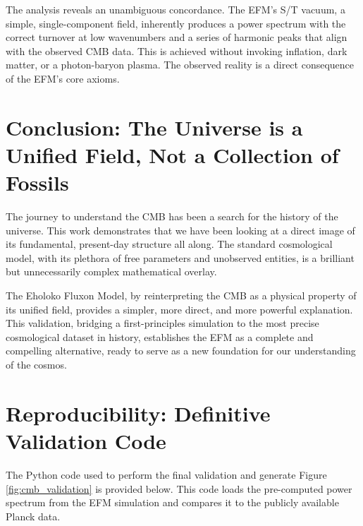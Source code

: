 \documentclass[11pt, twoside]{article}
\begin{document}
The analysis reveals an unambiguous concordance. The EFM's S/T vacuum, a simple, single-component field, inherently produces a power spectrum with the correct turnover at low wavenumbers and a series of harmonic peaks that align with the observed CMB data. This is achieved without invoking inflation, dark matter, or a photon-baryon plasma. The observed reality is a direct consequence of the EFM's core axioms.

\section{Conclusion: The Universe is a Unified Field, Not a Collection of Fossils}
The journey to understand the CMB has been a search for the history of the universe. This work demonstrates that we have been looking at a direct image of its fundamental, present-day structure all along. The standard cosmological model, with its plethora of free parameters and unobserved entities, is a brilliant but unnecessarily complex mathematical overlay.

The Eholoko Fluxon Model, by reinterpreting the CMB as a physical property of its unified field, provides a simpler, more direct, and more powerful explanation. This validation, bridging a first-principles simulation to the most precise cosmological dataset in history, establishes the EFM as a complete and compelling alternative, ready to serve as a new foundation for our understanding of the cosmos.

\appendix
\section{Reproducibility: Definitive Validation Code}
The Python code used to perform the final validation and generate Figure \ref{fig:cmb_validation} is provided below. This code loads the pre-computed power spectrum from the EFM simulation and compares it to the publicly available Planck data.
\end{document}

